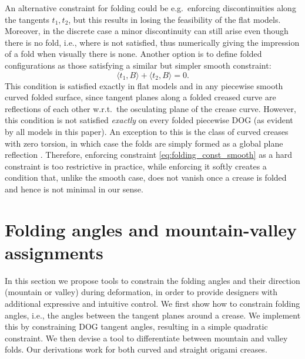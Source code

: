 An alternative constraint for folding could be e.g.\ enforcing discontinuities along the tangents $t_1,t_2$, but this results in losing the feasibility of the flat models. Moreover, in the discrete case a minor discontinuity can still arise even though there is no fold, i.e., where  is not satisfied, thus numerically giving the impression of a fold when visually there is none. Another option is to define folded configurations as those satisfying a similar but simpler smooth constraint:
%
\begin{equation} \label{eq:folding_const_smooth} 
\langle t_1,B\rangle + \langle t_2,B\rangle = 0.
\end{equation}
%
This condition is satisfied exactly in flat models and in any piecewise smooth curved folded surface, since tangent planes along a folded creased curve are reflections of each other w.r.t.\ the osculating plane of the crease curve. However, this condition is not satisfied \emph{exactly} on every folded piecewise DOG (as evident by all models in this paper). An exception to this is the class of curved creases with zero torsion, in which case the folds are simply formed as a global plane reflection \cite{Mitani_ref}. Therefore, enforcing constraint \eqref{eq:folding_const_smooth} as a hard constraint is too restrictive in practice, while enforcing it softly creates a condition that, unlike the smooth case, does not vanish once a crease is folded and hence is not minimal in our sense.


\section{Folding angles and mountain-valley assignments} \label{sec:folding_angles_mountain_valley}

In this section we propose tools to constrain the folding angles and their direction (mountain or valley) during deformation, in order to provide designers with additional expressive and intuitive control. We first show how to constrain folding angles, i.e., the angles between the tangent planes around a crease. We implement this by constraining DOG tangent angles, resulting in a simple quadratic constraint. We then devise a tool to differentiate between mountain and valley folds. Our derivations work for both curved and straight origami creases.

